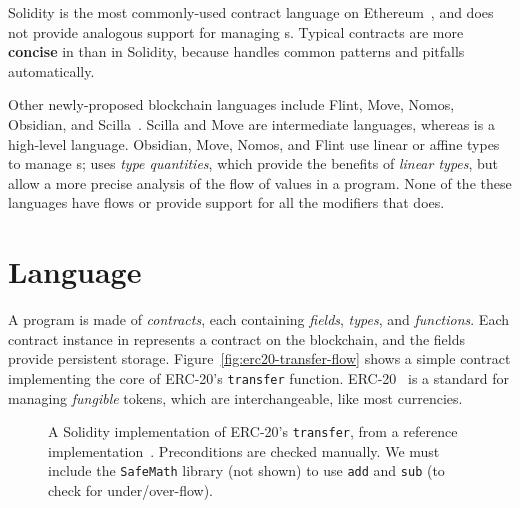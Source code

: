 \documentclass[dvipsnames, sigplan, screen]{acmart}
\begin{document}
Solidity is the most commonly-used contract language on Ethereum~\cite{EthereumForDevs}, and does not provide analogous support for managing \assetTxt{}s.
Typical contracts are more \textbf{concise} in \langName than in Solidity, because \langName handles common patterns and pitfalls automatically.

Other newly-proposed blockchain languages include Flint, Move, Nomos, Obsidian, and Scilla~\cite{schrans2018flint, blackshear2019move, das2019nomos, coblenz2019obsidian, sergey2019scilla}.
Scilla and Move are intermediate languages, whereas \langName is a high-level language.
Obsidian, Move, Nomos, and Flint use linear or affine types to manage \assetTxt{}s; \langName uses \emph{type quantities}, which provide the benefits of \emph{linear types}, but allow a more precise analysis of the flow of values in a program.
None of the these languages have flows or provide support for all the modifiers that \langName does.

\section{Language}\label{sec:lang}
A \langName program is made of \emph{contracts}, each containing \emph{fields}, \emph{types}, and \emph{functions}.
Each contract instance in \langName represents a contract on the blockchain, and the fields provide persistent storage.
Figure~\ref{fig:erc20-transfer-flow} shows a simple contract implementing the core of ERC-20's \lstinline{transfer} function.
ERC-20~\cite{erc20} is a standard for managing \emph{fungible} tokens, which are interchangeable, like most currencies.
\begin{figure}
    \centering
    
    \vspace{-1.6em}
    \caption{A Solidity implementation of ERC-20's \lstinline{transfer}, from a reference implementation~\cite{erc20Consensys}.
        Preconditions are checked manually.
        We must include the \lstinline{SafeMath} library (not shown) to use \lstinline{add} and \lstinline{sub} (to check for under/over-flow).}
    \label{fig:erc20-transfer-sol}
\end{figure}
\end{document}
